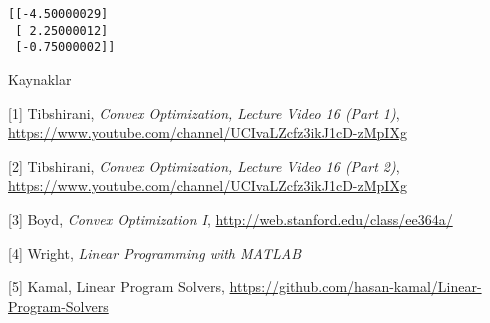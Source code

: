 \documentclass[12pt,fleqn]{article}\usepackage{../../common}
\begin{document}
\inputminted[fontsize=\footnotesize]{python}{pdq.py}

\begin{verbatim}
[[-4.50000029]
 [ 2.25000012]
 [-0.75000002]]
\end{verbatim}


Kaynaklar

[1] Tibshirani, {\em Convex Optimization, Lecture Video 16 (Part 1)}, 
\url{https://www.youtube.com/channel/UCIvaLZcfz3ikJ1cD-zMpIXg}   

[2] Tibshirani, {\em Convex Optimization, Lecture Video 16 (Part 2)}, 
\url{https://www.youtube.com/channel/UCIvaLZcfz3ikJ1cD-zMpIXg}   

[3] Boyd, {\em Convex Optimization I}, 
    \url{http://web.stanford.edu/class/ee364a/}

[4] Wright, {\em Linear Programming with MATLAB}

[5] Kamal, {Linear Program Solvers},
    \url{https://github.com/hasan-kamal/Linear-Program-Solvers}
\end{document}
